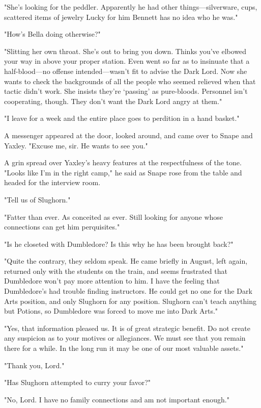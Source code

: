"She's looking for the peddler. Apparently he had other things—silverware, cups, scattered items of jewelry{\el} Lucky for him Bennett has no idea who he was."

"How's Bella doing otherwise?"

"Slitting her own throat. She's out to bring you down. Thinks you've elbowed your way in above your proper station. Even went so far as to insinuate that a half-blood—no offense intended—wasn't fit to advise the Dark Lord. Now she wants to check the backgrounds of all the people who seemed relieved when that tactic didn't work. She insists they're `passing' as pure-bloods. Personnel isn't cooperating, though. They don't want the Dark Lord angry at them."

"I leave for a week and the entire place goes to perdition in a hand basket."

A messenger appeared at the door, looked around, and came over to Snape and Yaxley. "Excuse me, sir. He wants to see you."

A grin spread over Yaxley's heavy features at the respectfulness of the tone. "Looks like I'm in the right camp," he said as Snape rose from the table and headed for the interview room.

"Tell us of Slughorn."

"Fatter than ever. As conceited as ever. Still looking for anyone whose connections can get him perquisites."

"Is he closeted with Dumbledore? Is this why he has been brought back?"

"Quite the contrary, they seldom speak. He came briefly in August, left again, returned only with the students on the train, and seems frustrated that Dumbledore won't pay more attention to him. I have the feeling that Dumbledore's had trouble finding instructors. He could get no one for the Dark Arts position, and only Slughorn for any position. Slughorn can't teach anything but Potions, so Dumbledore was forced to move me into Dark Arts."

"Yes, that information pleased us. It is of great strategic benefit. Do not create any suspicion as to your motives or allegiances. We must see that you remain there for a while. In the long run it may be one of our most valuable assets."

"Thank you, Lord."

"Has Slughorn attempted to curry your favor?"

"No, Lord. I have no family connections and am not important enough."

